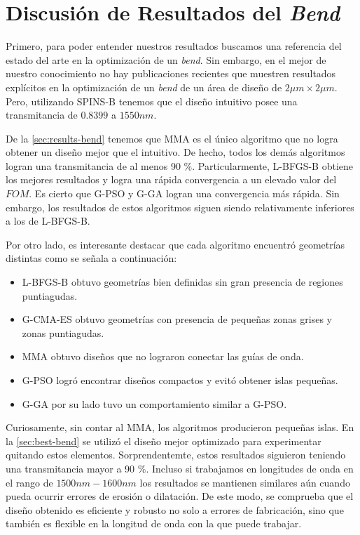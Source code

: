 \section{Discusión de Resultados del \emph{Bend}}

Primero, para poder entender nuestros resultados buscamos una referencia del estado del arte
en la optimización de un \emph{bend}.
Sin embargo, en el mejor de nuestro conocimiento no hay publicaciones recientes que muestren
resultados explícitos en la optimización de un \emph{bend} de un área de diseño de $2 \mu m \times 2 \mu m$.
Pero, utilizando SPINS-B tenemos que el diseño intuitivo posee una transmitancia de $0.8399$ a $1550 nm$.


De la \autoref{sec:results-bend} tenemos que MMA es el único algoritmo que no logra obtener un diseño
mejor que el intuitivo. 
De hecho, todos los demás algoritmos logran una transmitancia de al menos 90 \%.
Particularmente, L-BFGS-B obtiene los mejores resultados y logra una rápida convergencia a un
elevado valor del $FOM$.
Es cierto que G-PSO y G-GA logran una convergencia más rápida. Sin embargo, los 
resultados de estos algoritmos siguen siendo relativamente inferiores a los de L-BFGS-B.

Por otro lado, es interesante destacar que cada algoritmo encuentró geometrías distintas como se
señala a continuación:

\begin{itemize}
  \item L-BFGS-B obtuvo geometrías bien definidas sin gran presencia de regiones puntiagudas.

  \item G-CMA-ES obtuvo geometrías con presencia de pequeñas zonas grises y zonas puntiagudas.

  \item MMA obtuvo diseños que no lograron conectar las guías de onda.

  \item G-PSO logró encontrar diseños compactos y evitó obtener islas pequeñas.

  \item G-GA por su lado tuvo un comportamiento similar a G-PSO.

\end{itemize}

Curiosamente, sin contar al MMA, los algoritmos producieron pequeñas islas.
En la \autoref{sec:best-bend} se utilizó el diseño mejor optimizado para experimentar
quitando estos elementos. Sorprendentemte, estos resultados siguieron teniendo una transmitancia
mayor a 90 \%.
Incluso si trabajamos en longitudes de onda en el rango de $1500nm-1600nm$
los resultados se mantienen similares aún cuando pueda ocurrir errores de erosión o dilatación.
De este modo, se comprueba que el diseño obtenido es eficiente y robusto no solo a errores
de fabricación, sino que también es flexible en la longitud de onda con la que puede trabajar.

